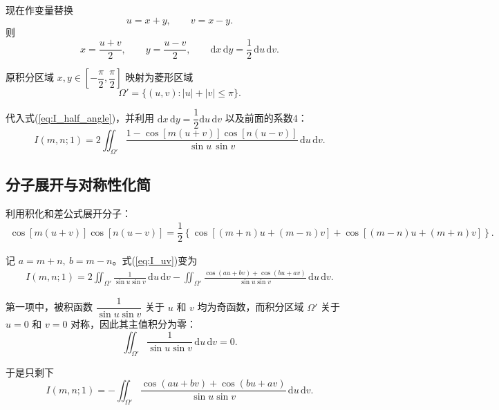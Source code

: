 \documentclass{article} %
\newcommand{\di}{\mathrm{d}}
\begin{document}
现在作变量替换
\begin{equation}
    u=x+y,\qquad v=x-y.
    \label{eq:uv_transform}
\end{equation}
则
\begin{equation}
    x=\dfrac{u+v}{2},\qquad y=\dfrac{u-v}{2},\qquad
    \di x\,\di y = \dfrac{1}{2}\,\di u\,\di v.
\end{equation}

原积分区域 $x,y\in\left[-\dfrac{\pi}{2},\dfrac{\pi}{2}\right]$ 映射为菱形区域
\begin{equation}
    \Omega'=\{(u,v): |u|+|v|\leqslant \pi\}.
\end{equation}

代入式(\ref{eq:I_half_angle})，并利用 $\di x\,\di y=\dfrac{1}{2}\di u\,\di v$ 以及前面的系数4：
\begin{equation}
    I(m,n;1)=2\iint_{\Omega'}
    \frac{1-\cos[m(u+v)]\cos[n(u-v)]}
    {\sin u\,\sin v}
    \,\di u\,\di v.
    \label{eq:I_uv}
\end{equation}

\subsection{分子展开与对称性化简}

利用积化和差公式展开分子：
\begin{align}
    \cos[m(u+v)]\cos[n(u-v)]=\dfrac{1}{2}\left \{\cos[(m+n)u+(m-n)v]+\cos[(m-n)u+(m+n)v]\right \}.
    \label{eq:cos_product_expand}
\end{align}

记 $a=m+n,\ b=m-n$。式(\ref{eq:I_uv})变为
\begin{align}
    I(m,n;1)=2\iint_{\Omega'}\frac{1}{\sin u\sin v}\,\di u\,\di v -\iint_{\Omega'}\frac{\cos(au+bv)+\cos(bu+av)}{\sin u\sin v}\,\di u\,\di v.
    \label{eq:I_split}
\end{align}

第一项中，被积函数 $\dfrac{1}{\sin u\sin v}$ 关于 $u$ 和 $v$ 均为奇函数，而积分区域 $\Omega'$ 关于 $u=0$ 和 $v=0$ 对称，因此其主值积分为零：
\begin{equation}
    \iint_{\Omega'}\frac{1}{\sin u\sin v}\,\di u\,\di v=0.
    \label{eq:const_term_zero}
\end{equation}

于是只剩下
\begin{equation}
    I(m,n;1)=-\iint_{\Omega'}\frac{\cos(au+bv)+\cos(bu+av)}{\sin u\sin v}\,\di u\,\di v.
    \label{eq:I_cos_only}
\end{equation}
\end{document}
